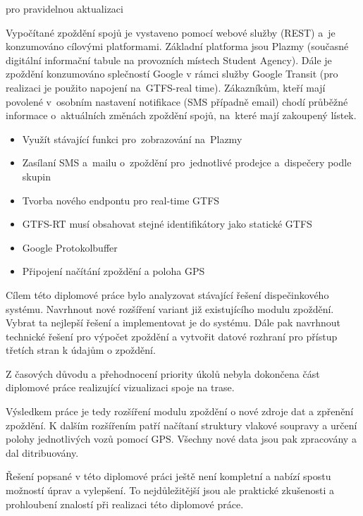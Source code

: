 	
 pro pravidelnou aktualizaci
	
	

Vypočítané zpoždění spojů je vystaveno pomocí webové služby (REST) a~je konzumováno cílovými platformami. Základní platforma jsou Plazmy (současné digitální informační tabule na provozních místech Student Agency). Dále je zpoždění konzumováno splečností Google v rámci služby Google Transit (pro realizaci je použito napojení na~GTFS-real time). Zákazníkům, kteří mají povolené v~osobním nastavení notifikace (SMS případně email) chodí průběžné informace o~aktuálních změnách zpoždění spojů, na~které mají zakoupený lístek.

\begin{itemize}
	\setlength{\parskip}{0pt}
	\setlength{\itemsep}{0pt}
	\item Využít stávající funkci pro~zobrazování na~Plazmy
	\item Zasílaní SMS a~mailu o~zpoždění pro~jednotlivé prodejce a~dispečery podle skupin
\end{itemize}

\begin{itemize}
	\setlength{\parskip}{0pt}
	\setlength{\itemsep}{0pt}
	\item Tvorba nového endpontu pro real-time GTFS
	\item GTFS-RT musí obsahovat stejné identifikátory jako statické GTFS
	\item Google Protokolbuffer
	\item Připojení načítání zpoždění a poloha GPS
\end{itemize}

Cílem této diplomové práce bylo analyzovat stávající řešení dispečinkového systému. Navrhnout nové rozšíření variant již existujícího modulu zpoždění. Vybrat ta nejlepší řešení a implementovat je do systému. Dále pak navrhnout technické řešení pro výpočet zpoždění a vytvořit datové rozhraní pro přístup třetích stran k údajům o zpoždění.

Z časových důvodu a přehodnocení priority úkolů nebyla dokončena část diplomové práce realizující vizualizaci spoje na trase.

Výsledkem práce je tedy rozšíření modulu zpoždění o nové zdroje dat a zpřenění zpoždění. K dalším rozšířením patří načítaní struktury vlakové soupravy a určení polohy jednotlivých vozů pomocí GPS. Všechny nové data jsou pak zpracovány a dal ditribuovány.

Řešení popsané v této diplomové práci ještě není kompletní a nabízí spostu možností úprav a vylepšení. To nejdůležitější jsou ale praktické zkušenosti a prohloubení znalostí při realizaci této diplomové práce.


